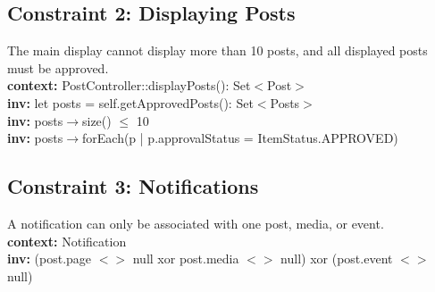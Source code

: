 \documentclass{article}
\begin{document}
\subsection{Constraint 2: Displaying Posts}

The main display cannot display more than 10 posts, and all displayed posts must be approved. \\

\textbf{context:} PostController::displayPosts(): Set$<$Post$>$ \\
\textbf{inv:} let posts = self.getApprovedPosts(): Set$<$Posts$>$ \\
\textbf{inv:} posts$\rightarrow$size() $\leq$ 10 \\
\textbf{inv:} posts$\rightarrow$forEach(p | p.approvalStatus = ItemStatus.APPROVED) \\

\subsection{Constraint 3: Notifications}

A notification can only be associated with one post, media, or event. \\

\textbf{context:} Notification \\
\textbf{inv:} (post.page $<$$>$ null xor post.media $<$$>$ null) xor (post.event $<$$>$ null)  \\
\end{document}
